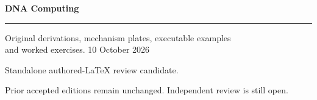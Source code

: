 \documentclass[11pt,oneside,openany]{book}
\begin{document}
\frontmatter
\begin{titlepage}
\color{Blue}\sffamily\vspace*{20mm}
{\Huge\bfseries DNA Computing\par}
\vspace{10mm}{\LARGE Chapter 32\par}
\vspace{8mm}{\Large From molecular computation to genomic computation\par}
\vspace{12mm}\rule{\linewidth}{.8pt}
\vspace{6mm}\par Original derivations, mechanism plates, executable examples\\and worked exercises.
\vfill 10 October 2026\par
Standalone authored-LaTeX review candidate.\par
Prior accepted editions remain unchanged. Independent review is still open.
\end{titlepage}
\tableofcontents
\mainmatter
\setcounter{chapter}{31}

\renewcommand{\bibname}{Sources and references}

\backmatter
\clearpage{}
\printindex
\end{document}
